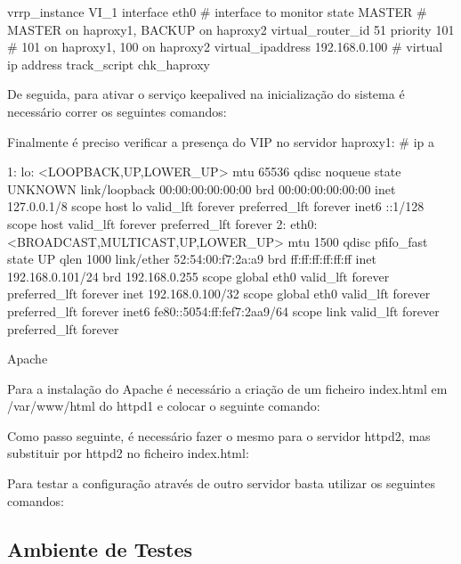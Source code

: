 vrrp_instance VI_1 {
  interface eth0 # interface to monitor
  state MASTER # MASTER on haproxy1, BACKUP on haproxy2
  virtual_router_id 51
  priority 101 # 101 on haproxy1, 100 on haproxy2
  virtual_ipaddress {
    192.168.0.100 # virtual ip address 
  }
  track_script {
    chk_haproxy
  }
}

De seguida, para ativar o serviço keepalived na inicialização do sistema é necessário correr os seguintes comandos:
 \par
{} \par

Finalmente é preciso verificar a presença do VIP no servidor haproxy1:
# ip a

1: lo: <LOOPBACK,UP,LOWER_UP> mtu 65536 qdisc noqueue state UNKNOWN
link/loopback 00:00:00:00:00:00 brd 00:00:00:00:00:00
inet 127.0.0.1/8 scope host lo
valid_lft forever preferred_lft forever
inet6 ::1/128 scope host
valid_lft forever preferred_lft forever
2: eth0: <BROADCAST,MULTICAST,UP,LOWER_UP> mtu 1500 qdisc pfifo_fast state UP qlen 1000
link/ether 52:54:00:f7:2a:a9 brd ff:ff:ff:ff:ff:ff
inet 192.168.0.101/24 brd 192.168.0.255 scope global eth0
valid_lft forever preferred_lft forever
inet 192.168.0.100/32 scope global eth0
valid_lft forever preferred_lft forever
inet6 fe80::5054:ff:fef7:2aa9/64 scope link
valid_lft forever preferred_lft forever

Apache

Para a instalação do Apache é necessário a criação de um ficheiro index.html em /var/www/html do httpd1 e colocar o seguinte comando:
 \par

Como passo seguinte, é necessário fazer o mesmo para o servidor httpd2, mas substituir por httpd2 no ficheiro index.html:
 \par

Para testar a configuração através de outro servidor basta utilizar os seguintes comandos:
 \par
{} \par

\subsection{Ambiente de Testes}


